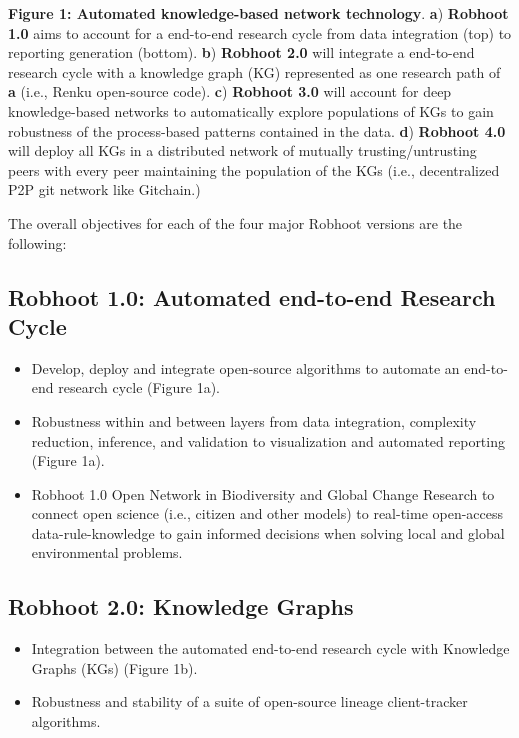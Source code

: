 \documentclass[10pt, a4paper, twocolumn]{article} %
\begin{document}
  {\small {\bf Figure 1: Automated knowledge-based network
      technology}. {\bf a}) {\bf Robhoot 1.0} aims to account for a
    end-to-end research cycle from data integration (top) to reporting
    generation (bottom). {\bf b}) {\bf Robhoot 2.0} will integrate a
    end-to-end research cycle with a knowledge graph (KG) represented
    as one research path of {\bf a} (i.e., Renku open-source
    code). {\bf c}) {\bf Robhoot 3.0} will account for deep
    knowledge-based networks to automatically explore populations of
    KGs to gain robustness of the process-based patterns contained in
    the data. {\bf d}) {\bf Robhoot 4.0} will deploy all KGs in a
    distributed network of mutually trusting/untrusting peers with
    every peer maintaining the population of the KGs (i.e.,
    decentralized P2P git network like Gitchain.)}
  
  The overall objectives for each of the four major Robhoot versions are the following:
  \vspace{-0.15 in}
   \subsection{Robhoot 1.0: Automated end-to-end Research Cycle}
   \begin{itemize}
   \item Develop, deploy and integrate open-source algorithms to
     automate an end-to-end research cycle (Figure 1a).
   \item Robustness within and between layers from data integration,
     complexity reduction, inference, and validation to visualization
     and automated reporting (Figure 1a).
   \item Robhoot 1.0 Open Network in Biodiversity and Global Change Research to connect
   open science (i.e., citizen and other models) to real-time open-access data-rule-knowledge
   to gain informed decisions when solving local and global
   environmental problems.
 \end{itemize}
 \vspace{-0.15 in}
 
  \subsection{Robhoot 2.0: Knowledge Graphs}
  \begin{itemize}
  \item Integration between the automated end-to-end research cycle with Knowledge Graphs (KGs) (Figure 1b).
  \item Robustness and stability of a suite of open-source lineage client-tracker algorithms.
  \end{itemize}
  \vspace{-0.15 in}
  
\end{document}
